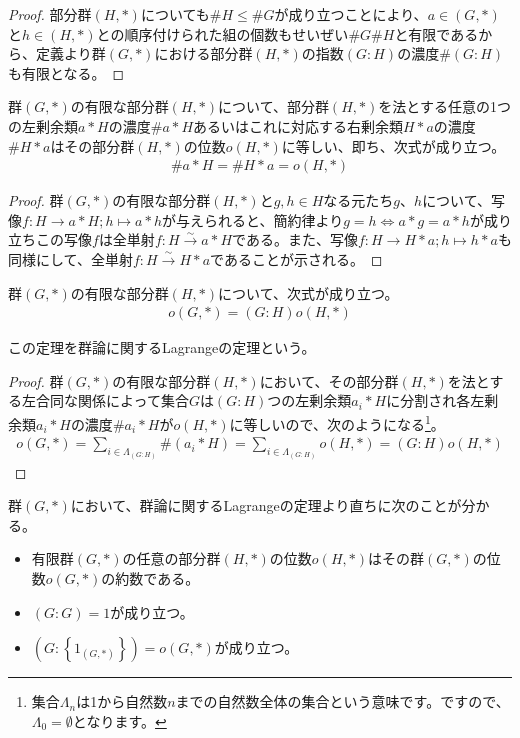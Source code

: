 \documentclass[dvipdfmx]{jsarticle}
\begin{document}
\begin{proof}
部分群$(H,*)$についても$\#H \leq \#G$が成り立つことにより、$a \in (G,*)$と$h \in (H,*)$との順序付けられた組の個数もせいぜい$\#G\#H$と有限であるから、定義より群$(G,*)$における部分群$(H,*)$の指数$(G:H)$の濃度$\#(G:H)$も有限となる。
\end{proof}
\begin{thm}\label{3.1.1.33}
群$(G,*)$の有限な部分群$(H,*)$について、部分群$(H,*)$を法とする任意の1つの左剰余類$a*H$の濃度$\#{a*H}$あるいはこれに対応する右剰余類$H*a$の濃度$\#{H*a}$はその部分群$(H,*)$の位数$o(H,*)$に等しい、即ち、次式が成り立つ。
\begin{align*}
\#{a*H} = \#{H*a} = o(H,*)
\end{align*}
\end{thm}
\begin{proof}
群$(G,*)$の有限な部分群$(H,*)$と$g,h \in H$なる元たち$g$、$h$について、写像$f:H \rightarrow a*H;h \mapsto a*h$が与えられると、簡約律より$g = h \Leftrightarrow a*g = a*h$が成り立ちこの写像$f$は全単射$f:H\overset{\sim}{\rightarrow}a*H$である。また、写像$f:H \rightarrow H*a;h \mapsto h*a$も同様にして、全単射$f:H\overset{\sim}{\rightarrow}H*a$であることが示される。
\end{proof}
\begin{thm}[群論に関するLagrangeの定理]\label{3.1.1.34}
群$(G,*)$の有限な部分群$(H,*)$について、次式が成り立つ。
\begin{align*}
o(G,*) = (G:H)o(H,*)
\end{align*}\par
この定理を群論に関するLagrangeの定理という。
\end{thm}
\begin{proof}
群$(G,*)$の有限な部分群$(H,*)$において、その部分群$(H,*)$を法とする左合同な関係によって集合$G$は$(G:H)$つの左剰余類$a_{i}*H$に分割され各左剰余類$a_{i}*H$の濃度$\#{a_{i}*H}$が$o(H,*)$に等しいので、次のようになる\footnote{集合$\varLambda_{n}$は1から自然数$n$までの自然数全体の集合という意味です。ですので、$\varLambda_{0} = \emptyset $となります。}。
\begin{align*}
o(G,*) = \sum_{i \in \varLambda_{(G:H)}} {\#\left( a_{i}*H \right)} = \sum_{i \in \varLambda_{(G:H)}} {o(H,*)} = (G:H)o(H,*)
\end{align*}
\end{proof}
\begin{thm}\label{3.1.1.35}
群$(G,*)$において、群論に関するLagrangeの定理より直ちに次のことが分かる。
\begin{itemize}
\item
  有限群$(G,*)$の任意の部分群$(H,*)$の位数$o(H,*)$はその群$(G,*)$の位数$o(G,*)$の約数である。
\item
  $(G:G) = 1$が成り立つ。
\item
  $\left( G:\left\{ 1_{(G,*)} \right\} \right) = o(G,*)$が成り立つ。
\end{itemize}
\end{thm}
\end{document}
